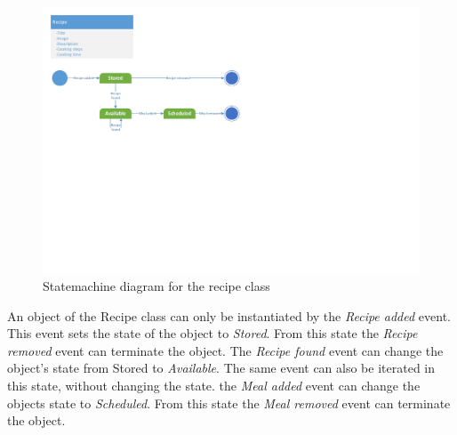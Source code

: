 \begin{figure}[H]
	\centering
	\includegraphics[clip=true, trim=0.5cm 11cm 14cm 0.5cm]{Grafik/FoodPlanner/Recipe.pdf}
	\caption{Statemachine diagram for the recipe class} \label{RecipeClass}
\end{figure}

An object of the Recipe class can only be instantiated by the \textit{Recipe added} event. This event sets the state of the object to \textit{Stored}. From this state the \textit{Recipe removed} event can terminate the object. The \textit{Recipe found} event can change the object's state from Stored to \textit{Available}. The same event can also be iterated in this state, without changing the state. the \textit{Meal added} event can change the objects state to \textit{Scheduled}. From this state the \textit{Meal removed} event can terminate the object.